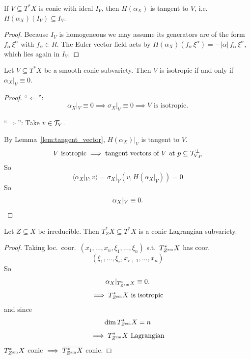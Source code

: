 \begin{lemma}[Lemma~9.4]\label{lem:tangent_vector}
    If $V\subseteq T^\ast X$ is conic with ideal $I_V$, then $H(\alpha_X)$ is
    tangent to $V$, i.e.\ $H(\alpha_X)(I_V)\subseteq I_V$.
\end{lemma}
\begin{proof}
    Because $I_V$ is homogeneous we may assume its generators are of the form
    $f_\alpha\,\xi^\alpha$ with $f_\alpha\in R$.  The Euler vector field acts by
    $H(\alpha_X)(f_\alpha\,\xi^\alpha)=-|\alpha|\,f_\alpha\,\xi^\alpha$, which lies
    again in $I_V$.
\end{proof}

\begin{lemma}[Lemma~9.5]\label{lem:9.5}
    Let $V\subseteq T^\ast X$ be a smooth conic subvariety.  Then $V$ is isotropic
    if and only if $\alpha_X|_V\equiv 0$.
\end{lemma}
\begin{proof}
    \noindent ``$\Leftarrow$'':
    \[
        \alpha_X|_V \equiv 0 \implies \sigma_X|_V \equiv 0 \implies V \text{ is isotropic.}
    \]

    \noindent ``$\Rightarrow$'':
    Take $v \in \mathcal{T}_V$.

    \vspace{1em}
    \noindent By Lemma~\ref{lem:tangent_vector}, $H(\alpha_X)|_V$ is tangent to $V$.
    \[
        V \text{ isotropic} \implies \text{tangent vectors of } V \text{ at } p \subseteq \mathcal{T}_{V,p}^\perp
    \]
    So
    \[
        \langle \alpha_X|_V, v \rangle = \sigma_X|_V ( v, H(\alpha_X|_V) ) = 0
    \]
    So
    \[
        \alpha_X|_V \equiv 0. \qedhere
    \]
\end{proof}

\begin{corollary}[Cor.~9.6]
    Let $Z\subseteq X$ be irreducible.  Then $T^\ast_Z X\subseteq T^\ast X$ is a
    conic Lagrangian subvariety.
\end{corollary}
\begin{proof}
    Taking loc.\ coor.\ $(x_1, \dots, x_n, \xi_1, \dots, \xi_n)$
    s.t.\ $T^*_{Z^{\mathrm{sm}}} X$ has coor.
    \[
        (\xi_1, \dots, \xi_r, x_{r+1}, \dots, x_n)
    \]
    So
    \[
        \alpha_X|_{T^*_{Z^{\mathrm{sm}}} X} \equiv 0.
    \]
    \[
        \implies T^*_{Z^{\mathrm{sm}}} X \text{ is isotropic}
    \]
    and since
    \[
        \dim T^*_{Z^{\mathrm{sm}}} X = n
    \]
    \[
        \implies T^*_{Z^{\mathrm{sm}}} X \text{ Lagrangian}
    \]
    $T^*_{Z^{\mathrm{sm}}} X$ conic $\implies \overline{T^*_{Z^{\mathrm{sm}}} X}$ conic. \qedhere
\end{proof}

